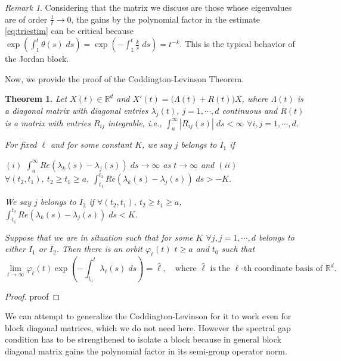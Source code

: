 \documentclass[a4paper,11pt]{article}
\def\blue{\color{blue}}
\newtheorem{theorem}{Theorem}
\theoremstyle{remark}
\newtheorem{remark}{Remark}[section]
\begin{document}
\begin{remark}
 Considering that the matrix we discuss are those whose eigenvalues are of order $\tfrac{1}{t} \rightarrow 0$, the gains by the polynomial factor in the estimate \eqref{eq:triestim} can be critical because $\exp\left( \int_1^t \theta(s)\;ds\right) =\exp\left( -\int_1^t \frac{k}{s}\;ds\right) =t^{-k}.$ This is the typical behavior of the Jordan block.
\end{remark}
Now, we provide the proof of the Coddington-Levinson Theorem.

\begin{theorem}{\cite[Diagonal Version]{CL1955}}\label{thm:CL} Let $X(t)\in \mathbb{R}^d$ and $X'(t) = \big(\Lambda(t) + R(t)\big)X$, where $\Lambda(t)$ is a diagonal matrix with diagonal entries $\lambda_j(t)$, $j=1,\cdots,d$ continuous and $R(t)$ is a matrix with entries $R_{ij}$ integrable, i.e., $\int_{a}^\infty |R_{ij}(s)|\; ds < \infty$ $\forall i,j=1,\cdots,d$.

For fixed $\ell$ and for some constant $K$, we say $j$ belongs to $I_1$ if

$(i)$ $\int_{a}^\infty Re(\lambda_k(s) -\lambda_j(s))\; ds \rightarrow \infty$ as $t \rightarrow \infty$ and $(ii)$ $\forall (t_2, t_1), \:t_2\ge t_1 \ge a$, $\int_{t_1}^{t_2} Re(\lambda_k(s) -\lambda_j(s))\; ds > -K$.

We say $j$ belongs to $I_2$ if $\forall (t_2, t_1), \: t_2\ge t_1 \ge a$, $\int_{t_1}^{t_2} Re(\lambda_k(s) -\lambda_j(s))\; ds < K$.

Suppose that we are in situation such that for some $K$ $\forall j, j=1,\cdots,d$ belongs to either $I_1$ or $I_2$. Then there is an orbit $\varphi_\ell(t)$ $t\ge a$ and $t_0$ such that
\begin{equation}
 \lim_{t \rightarrow \infty} \varphi_\ell(t) \exp\left(-\int_{t_0}^t \lambda_\ell(s)\; ds\right) = \hat{\ell}, \quad \text{where $\hat{\ell}$ is the $\ell$-th coordinate basis of $\mathbb{R}^d$.}
\end{equation}
\end{theorem}
\begin{proof}
{\blue proof}
\end{proof}

We can attempt to generalize the Coddington-Levinson for it to work even for block diagonal matrices, which we do not need here. However the spectral gap condition has to be strengthened to isolate a block because in general block diagonal matrix gains the polynomial factor in its semi-group operator norm.
\end{document}
